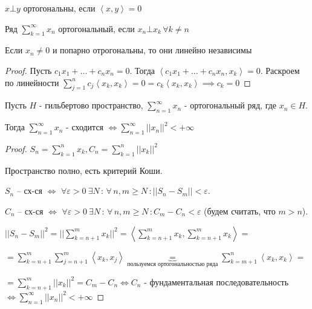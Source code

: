 \begin{definition}
    $x \bot y$ ортогональны, если $\left< x, y \right> = 0$
\end{definition}

\begin{definition}
    Ряд $\sum_{k=1}^{\infty} x_n$ ортогональный, если $x_n \bot x_k \, \forall k \neq n$
\end{definition}

\begin{remark}
    Если $x_n \neq 0$ и попарно отрогональны, то они линейно независимы

    \begin{proof}
        Пусть $c_1 x_1 + \ldots + c_n x_n = 0$. Тогда $\left < c_1 x_1 + \ldots + c_n x_n , x_k \right > = 0 $. Раскроем по линейности
        $\sum_{j = 1}^n c_j \left < x_k, x_k \right > = 0 = c_k \left < x_k, x_k \right > \implies c_k = 0$
    \end{proof}
\end{remark}

\begin{theorem}
    Пусть $H$ - гильбертово пространство, $\sum_{n = 1}^{\infty} x_n$ - ортогональный ряд, где $x_n \in H$.

    Тогда $\sum_{n = 1}^\infty x_n $ - сходится $\Longleftrightarrow \sum_{n = 1}^\infty || x_n ||^2 < +\infty$
\end{theorem}

\begin{proof}
    $S_n = \sum_{k = 1}^n x_k, C_n = \sum_{k = 1}^n ||x_k||^2$

    Пространство полно, есть критерий Коши.

    $S_n$ -- сх-ся $\Leftrightarrow$ $\forall \varepsilon > 0  \ \exists N \, : \, \forall \, n, m \geqslant N \, : ||S_n - S_m|| < \varepsilon$.

    $C_n$ -- сх-ся $\Leftrightarrow$ $\forall \varepsilon > 0 \ \exists N \, : \, \forall \, n, m \geqslant N \, : C_m - C_n < \varepsilon$ (будем считать, что $m > n$).

    \bigskip

    $||S_n - S_m||^2 = || \sum_{k = n + 1}^m x_k ||^2 = \left < \sum_{k = n + 1}^m x_k, \sum_{k = n + 1}^m x_k \right > =$

    $= \sum_{k=n+1}^{m} \sum_{j=n+1}^{m} \left< x_k, x_j \right> \underbrace{=}_{\text{пользуемся ортогональностью ряда}} \sum_{k = m + 1}^n \left < x_k , x_k \right > =$

    $= \sum_{k = n + 1}^m ||x_k||^2 = C_m - C_n \Longleftrightarrow C_n$ - фундаментальная последовательность $\Longleftrightarrow \sum_{n = 1}^\infty ||x_n||^2 < +\infty$
\end{proof}


